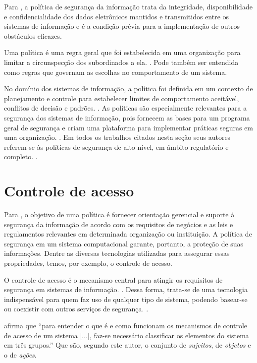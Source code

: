 Para \cite{straub_effective_1990}, a política de segurança da informação trata da integridade, disponibilidade e confidencialidade dos dados eletrônicos mantidos e transmitidos entre os sistemas de informação e é a condição prévia para a implementação de outros obstáculos eficazes.

Uma política é uma regra geral que foi estabelecida em uma organização para limitar a circunspecção dos subordinados a ela. \cite{simon_administrative_1997}. Pode também ser entendida como regras que governam as escolhas no comportamento de um sistema. \cite{sloman_security_2002} \cite{moffett_policy_1994}

No domínio dos sistemas de informação, a política foi definida em um contexto de planejamento e controle para estabelecer limites de comportamento aceitável, conflitos de decisão e padrões. \cite{davis_management_1984}. As políticas são especialmente relevantes para a segurança dos sistemas de informação, pois fornecem as bases para um programa geral de segurança e criam uma plataforma para implementar práticas seguras em uma organização. \cite{von_solms_policies_2004}. Em todos os trabalhos citados nesta seção seus autores referem-se às políticas de segurança de alto nível, em âmbito regulatório e completo. \cite{monteiro_adocao_2017}.

\section{Controle de acesso}

Para \cite{knapp_information_2009}, o objetivo de uma política é fornecer orientação gerencial e suporte à segurança da informação de acordo com os requisitos de negócios e as leis e regulamentos relevantes em determinada organização ou instituição. A política de segurança em um sistema computacional garante, portanto, a proteção de suas informações. Dentre as diversas tecnologias utilizadas para assegurar essas propriedades, temos, por exemplo, o controle de acesso. \cite{sarkis:artigo:2016}

O controle de acesso é o mecanismo central para atingir os requisitos de segurança em  sistemas  de  informação. \cite{wang_conflicts_2010}. Dessa forma,  trata-se  de  uma  tecnologia indispensável para quem faz uso de qualquer tipo de sistema, podendo basear-se ou coexistir com outros serviços de segurança. \cite{sandhu:1996}.

\cite[p. 8]{kropiwiec_policy_nodate} afirma que ``para entender o que é e como funcionam os mecanismos de controle de acesso de um sistema [...], faz-se necessário classificar os elementos do sistema em três grupos.'' Que são, segundo este autor, o conjunto de \textit{sujeitos}, de \textit{objetos} e o de \textit{ações}.

